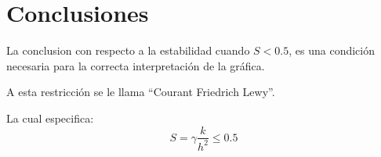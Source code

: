 \documentclass[a4paper,12pt]{article}
\newcommand{\eq}[1]{$#1$}
\begin{document}
    \section{Conclusiones}
    La conclusion con respecto a la estabilidad cuando \eq{S < 0.5}, es una condición
    necesaria para la correcta interpretación de la gráfica.

    A esta restricción se le llama ``Courant Friedrich Lewy''.

    La cual especifica:
    \begin{equation}
        S = \gamma\frac{k}{h^2} \leq 0.5
    \end{equation}

    
\end{document}
